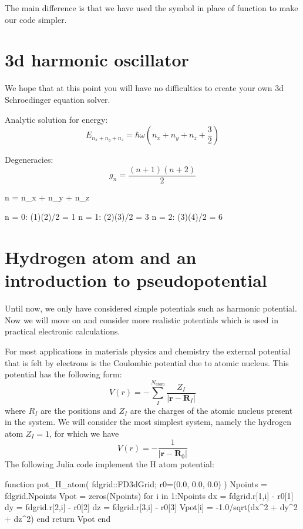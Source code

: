The main difference is that we have used the symbol  in place
of  function to make our code simpler.


\section{3d harmonic oscillator}

We hope that at this point you will have no difficulties to create your own
3d Schroedinger equation solver.

Analytic solution for energy:
\begin{equation}
E_{n_{x} + n_{y} + n_{z}} = \hbar \omega \left( n_{x} + n_{y} + n_{z} + \frac{3}{2} \right)
\end{equation}

Degeneracies:
\begin{equation}
g_{n} = \frac{(n + 1)(n + 2)}{2}
\end{equation}

\begin{textcode}
n = n_x + n_y + n_z

n = 0: (1)(2)/2 = 1
n = 1: (2)(3)/2 = 3
n = 2: (3)(4)/2 = 6
\end{textcode}


\section{Hydrogen atom and an introduction to pseudopotential}

Until now, we only have considered simple potentials such as harmonic potential. Now we will
move on and consider more realistic potentials which is used in practical electronic calculations.

For most applications in materials physics and chemistry the external potential that is
felt by electrons is the Coulombic potential due to atomic nucleus. This potential has
the following form:
\begin{equation}
V(r) = -\sum_{I}^{N_{\mathrm{atom}}} \frac{Z_{I}}{\left|\mathbf{r} - \mathbf{R}_{I}\right|}
\end{equation}
where $R_{I}$ are the positions and $Z_{I}$ are the charges
of the atomic nucleus present in the system.
%
We will consider the most simplest system, namely the hydrogen atom $Z_{I}=1$, for which we have
\begin{equation}
V(r) = -\frac{1}{\left|\mathbf{r} - \mathbf{R}_{0}\right|}
\end{equation}
%
The following Julia code implement the H atom potential:
\begin{juliacode}
function pot_H_atom( fdgrid::FD3dGrid; r0=(0.0, 0.0, 0.0) )
    Npoints = fdgrid.Npoints
    Vpot = zeros(Npoints)
    for i in 1:Npoints
        dx = fdgrid.r[1,i] - r0[1]
        dy = fdgrid.r[2,i] - r0[2]
        dz = fdgrid.r[3,i] - r0[3]
        Vpot[i] = -1.0/sqrt(dx^2 + dy^2 + dz^2)
    end
    return Vpot
end
\end{juliacode}


